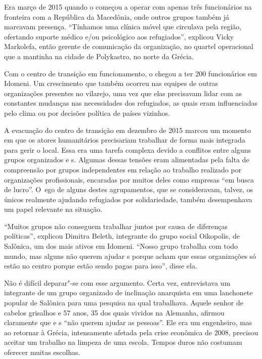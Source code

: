 \putodd{}
\clearpage

 

Era março de 2015 quando o  começou a operar com apenas três funcionários na fronteira
com a República da Macedônia, onde outros grupos também já
marcavam  presença. ``Tínhamos uma clínica móvel que circulava pela
região, ofertando suporte médico e/ou psicológico aos refugiados'',
explicou Vicky Markolefa, então gerente de comunicação da organização,
no quartel operacional que a  mantinha na cidade de Polykastro, no
norte da Grécia.

Com o centro de transição em funcionamento, o  chegou a ter 200
funcionários em Idomeni. Um crescimento que também ocorreu nas equipes
de outras organizações presentes no vilarejo, uma vez que elas
precisavam lidar com as constantes mudanças nas necessidades dos
refugiados, as quais eram influenciadas pelo clima ou por decisões
política de países vizinhos.

A evacuação do centro de transição em dezembro de 2015 marcou um momento
em que os atores humanitários precisariam trabalhar de forma mais
integrada para gerir o local. Essa era uma tarefa complexa devido a
conflitos entre alguns grupos organizados e s. Algumas dessas tensões
eram alimentadas pela falta de compreensão por grupos independentes em
relação ao trabalho realizado por organizações profissionais, encaradas
por muitos deles como empresas ``em busca de lucro''. O~ego de alguns
destes agrupamentos, que se consideravam, talvez, os únicos realmente
ajudando refugiados por solidariedade, também desempenhava um papel
relevante na situação.

``Muitos grupos não conseguem trabalhar juntos por causa de diferenças
políticas'', explicou Dimitra Beleth, integrante do grupo social
Oikopolis, de Salônica, um dos mais ativos em Idomeni. ``Nosso grupo
trabalha com todo mundo, mas alguns não querem ajudar s porque acham
que essas organizações só estão no centro porque estão sendo pagas para
isso'', disse ela.

Não é difícil deparar"-se com esse argumento. Certa vez, entrevistava um
integrante de um grupo organizado de inclinação anarquista em uma
lanchonete popular de Salônica para uma pesquisa na qual trabalhava.
Aquele senhor de cabelos grisalhos e 57 anos, 35 dos quais vividos na
Alemanha, afirmou claramente que  e s ``não querem ajudar as
pessoas''. Ele era um engenheiro, mas ao retornar à Grécia, intensamente
afetada pela crise econômica de 2008, precisou aceitar um trabalho na
limpeza de uma escola. Tempos duros não costumam oferecer muitas
escolhas.

